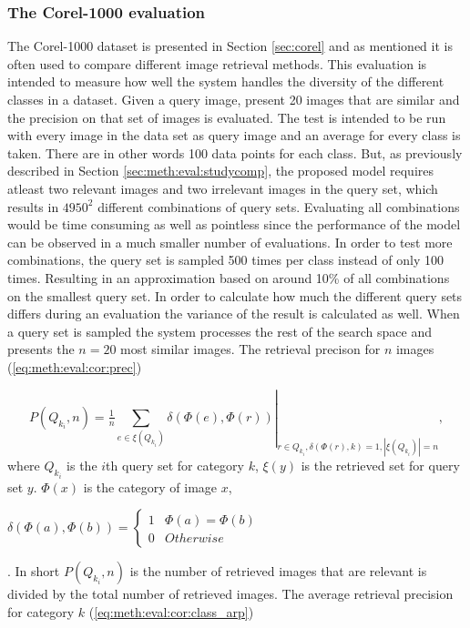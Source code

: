 \subsubsection{The Corel-1000 evaluation}
\label{sec:meth:eval:studycomp:corel}

The Corel-1000 dataset is presented in Section \ref{sec:corel} and as mentioned it is often used to compare different image retrieval methods. This evaluation is intended to measure how well the system handles the diversity of the different classes in a dataset. Given a query image, present 20 images that are similar and the precision on that set of images is evaluated. The test is intended to be run with every image in the data set as query image and an average for every class is taken. There are in other words 100 data points for each class. But, as previously described in Section \ref{sec:meth:eval:studycomp}, the proposed model requires atleast two relevant images and two irrelevant images in the query set, which results in $4950^2$ different combinations of query sets. Evaluating all combinations would be time consuming as well as pointless since the performance of the model can be observed in a much smaller number of evaluations. In order to test more combinations, the query set is sampled 500 times per class instead of only 100 times. Resulting in an approximation based on around 10\% of all combinations on the smallest query set. In order to calculate how much the different query sets differs during an evaluation the variance of the result is calculated as well. When a query set is sampled the system processes the rest of the search space and presents the $n=20$ most similar images. The retrieval precison for $n$ images (\ref{eq:meth:eval:cor:prec})

\begin{equation}
\label{eq:meth:eval:cor:prec}
P(Q_{k_i}, n) = \left . \tfrac{1}{n}\sum_{e \in \xi(Q_{k_i})} \delta(\Phi(e), \Phi(r)) \right |_{ r \in Q_{k_i},  \delta(\Phi(r), k)=1, |\xi(Q_{k_i})|=n},
\end{equation}
where $Q_{k_i}$ is the $i$th query set for category $k$, $\xi(y)$ is the retrieved set for query set $y$. $\Phi(x)$ is the category of image $x$, \begin{tiny}$\delta(\Phi(a), \Phi(b)) = \left \{ 
\begin{matrix} 
1 & \Phi(a) = \Phi(b) \\
0 & Otherwise
\end{matrix}\right.$\end{tiny}.
 In short $P(Q_{k_i}, n)$ is the number of retrieved images that are relevant is divided by the total number of retrieved images. 
 The average retrieval precision for category $k$ (\ref{eq:meth:eval:cor:class_arp}) 


